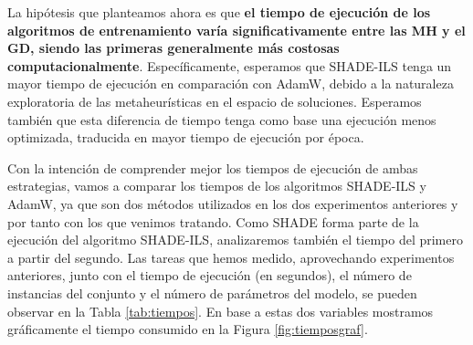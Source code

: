 La hipótesis que planteamos ahora es que \textbf{el tiempo de ejecución de los algoritmos de entrenamiento varía significativamente entre las MH y el GD, siendo las primeras generalmente más costosas computacionalmente}. Específicamente, esperamos que SHADE-ILS tenga un mayor tiempo de ejecución en comparación con AdamW, debido a la naturaleza exploratoria de las metaheurísticas en el espacio de soluciones. Esperamos también que esta diferencia de tiempo tenga como base una ejecución menos optimizada, traducida en mayor tiempo de ejecución por época.

Con la intención de comprender mejor los tiempos de ejecución de ambas estrategias, vamos a comparar los tiempos de los algoritmos SHADE-ILS y AdamW, ya que son dos métodos utilizados en los dos experimentos anteriores y por tanto con los que venimos tratando. Como SHADE forma parte de la ejecución del algoritmo SHADE-ILS, analizaremos también el tiempo del primero a partir del segundo. Las tareas que hemos medido, aprovechando experimentos anteriores, junto con el tiempo de ejecución (en segundos), el número de instancias del conjunto y el número de parámetros del modelo, se pueden observar en la Tabla \ref{tab:tiempos}. En base a estas dos variables mostramos gráficamente el tiempo consumido en la Figura \ref{fig:tiemposgraf}.

